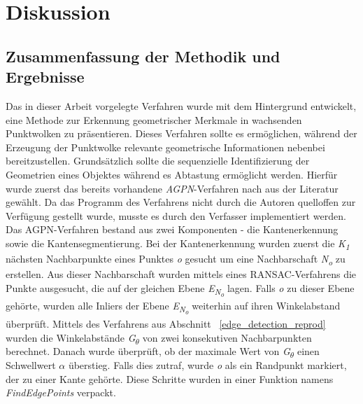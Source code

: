 
\chapter{Diskussion} \label{diskussion}
\section{Zusammenfassung der Methodik und Ergebnisse}
Das in dieser Arbeit vorgelegte Verfahren wurde mit dem Hintergrund entwickelt, eine Methode zur Erkennung geometrischer Merkmale in wachsenden Punktwolken zu präsentieren. Dieses Verfahren sollte es ermöglichen, während der Erzeugung der Punktwolke relevante geometrische Informationen nebenbei bereitzustellen. Grundsätzlich sollte die sequenzielle Identifizierung der Geometrien eines Objektes während es Abtastung ermöglicht werden. Hierfür wurde zuerst das bereits vorhandene \textit{AGPN}-Verfahren nach \autocite{ni_edge_2016} aus der Literatur gewählt. Da das Programm des Verfahrens nicht durch die Autoren quelloffen zur Verfügung gestellt wurde, musste es durch den Verfasser implementiert werden. Das AGPN-Verfahren bestand aus zwei Komponenten - die Kantenerkennung sowie die Kantensegmentierung. Bei der Kantenerkennung wurden zuerst die \textit{K\textsubscript{1}} nächsten Nachbarpunkte eines Punktes \textit{o} gesucht um eine Nachbarschaft \textit{N\textsubscript{o}} zu erstellen. Aus dieser Nachbarschaft wurden mittels eines RANSAC-Verfahrens die Punkte ausgesucht, die auf der gleichen Ebene \textit{E\textsubscript{N\textsubscript{o}}} lagen. Falls \textit{o} zu dieser Ebene gehörte, wurden alle Inliers der Ebene \textit{E\textsubscript{N\textsubscript{o}}} weiterhin auf ihren Winkelabstand überprüft. Mittels des Verfahrens aus Abschnitt ~\ref{edge_detection_reprod} wurden die Winkelabstände \textit{G\textsubscript{$\theta$}} von zwei konsekutiven Nachbarpunkten berechnet. Danach wurde überprüft, ob der maximale Wert von \textit{G\textsubscript{$\theta$}} einen Schwellwert \textit{$\alpha$} überstieg. Falls dies zutraf, wurde \textit{o} als ein Randpunkt markiert, der zu einer Kante gehörte. Diese Schritte wurden in einer Funktion namens \textit{FindEdgePoints} verpackt. 

